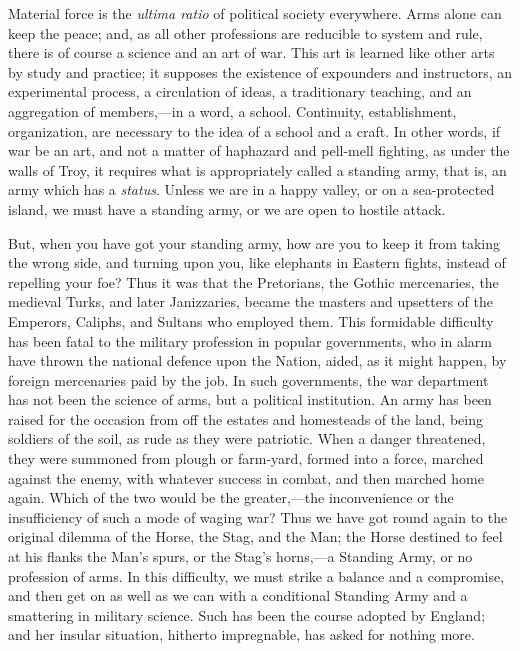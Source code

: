Material force is the \emph{ultima ratio} of
political society everywhere. Arms alone can keep the peace; and, as
all other professions are reducible to system and rule, there is of
course a science and an art of war. This art is learned like other
arts by study and practice; it supposes the existence of expounders
and instructors, an experimental process, a circulation of ideas, a
traditionary teaching, and an aggregation of members,—in a word, a
school. Continuity, establishment, organization, are necessary to the
idea of a school and a craft. In other words, if war be an art, and
not a matter of haphazard and pell-mell fighting, as under the walls
of Troy, it requires what is appropriately called a standing army,
that is, an army which has a \emph{status}. Unless we are in a happy
valley, or on a sea-protected island, we must have a standing army, or
we are open to hostile attack.

But, when you have got your standing army, how
are you to keep it from taking the wrong side, and turning upon you,
like elephants in Eastern fights, instead of repelling your foe?
Thus it was that the Pretorians, the Gothic mercenaries, the medieval
Turks, and later Janizzaries, became the masters and upsetters of the
Emperors, Caliphs, and Sultans who employed them. This formidable
difficulty has been fatal to the military profession in popular
governments, who in alarm have thrown the national defence upon the
Nation, aided, as it might happen, by foreign mercenaries paid by the
job. In such governments, the war department has not been the science
of arms, but a political institution. An army has been raised for the
occasion from off the estates and homesteads of the land, being
soldiers of the soil, as rude as they were patriotic. When a danger
threatened, they were summoned from plough or farm-yard, formed into a
force, marched against the enemy, with whatever success in combat, and
then marched home again. Which of the two would be the greater,—the
inconvenience or the insufficiency of such a mode of waging war? Thus
we have got round again to the original dilemma of the Horse, the
Stag, and the Man; the Horse destined to feel at his flanks the Man's
spurs, or the Stag's horns,—a Standing Army, or no profession of
arms. In this difficulty, we must strike a balance and a compromise,
and then get on as well as we can with a conditional Standing Army and
a smattering in military science. Such has been the course adopted by
England; and her insular situation, hitherto impregnable, has asked
for nothing more.

